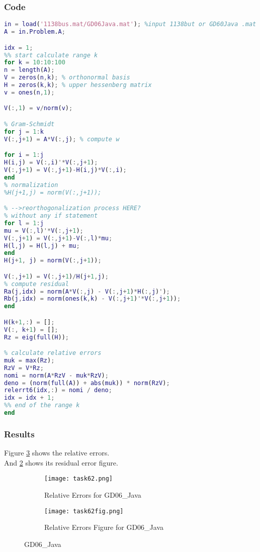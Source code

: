\documentclass{article}
\begin{document}
\subsubsection{Code}
\begin{lstlisting}[language=Matlab, caption=gd06java.m]
in = load('1138bus.mat/GD06Java.mat'); %input 1138but or GD60Java .mat file
A = in.Problem.A;

idx = 1;
%% start calculate range k
for k = 10:10:100
n = length(A);
V = zeros(n,k); % orthonormal basis
H = zeros(k,k); % upper hessenberg matrix
v = ones(n,1);

V(:,1) = v/norm(v);

% Gram-Schmidt
for j = 1:k
V(:,j+1) = A*V(:,j); % compute w

for i = 1:j
H(i,j) = V(:,i)'*V(:,j+1);
V(:,j+1) = V(:,j+1)-H(i,j)*V(:,i);
end
% normalization
%H(j+1,j) = norm(V(:,j+1));

% -->reorthogonalization process HERE?
% without any if statement
for l = 1:j
mu = V(:,l)'*V(:,j+1);
V(:,j+1) = V(:,j+1)-V(:,l)*mu;
H(l,j) = H(l,j) + mu;
end
H(j+1, j) = norm(V(:,j+1));

V(:,j+1) = V(:,j+1)/H(j+1,j);
% compute residual
Ra(j,idx) = norm(A*V(:,j) - V(:,j+1)*H(:,j)');
Rb(j,idx) = norm(ones(k,k) - V(:,j+1)'*V(:,j+1));
end

H(k+1,:) = [];
V(:, k+1) = [];
Rz = eig(full(H));

% calculate relative errors
muk = max(Rz);
RzV = V*Rz;
nomi = norm(A*RzV - muk*RzV);
deno = (norm(full(A)) + abs(muk)) * norm(RzV);
relerrt6(idx,:) = nomi / deno;
idx = idx + 1;
%% end of the range k
end
\end{lstlisting}
\subsubsection{Results}
\begin{flushleft}
Figure \ref{fig:task62} shows the relative errors.\\
And \ref{fig:task62fig} shows its residual error figure.
\end{flushleft}
\begin{figure}[H]
    \centering
    \begin{subfigure}{0.5\textwidth}
        \centering
        \texttt{[image: task62.png]}
        \caption{Relative Errors for GD06\_Java}
        \label{fig:task62}
    \end{subfigure}
    \begin{subfigure}{0.5\textwidth}
        \centering
        \texttt{[image: task62fig.png]}
        \caption{Relative Errors Figure for GD06\_Java}
        \label{fig:task62fig}
    \end{subfigure}
    \caption{GD06\_Java}
    \label{fig:task62}
\end{figure}
\end{document}
